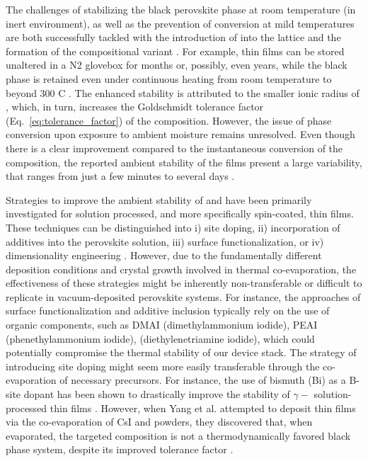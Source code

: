 The challenges of stabilizing the black perovskite phase at room temperature (in inert environment), as well as the prevention of conversion at mild temperatures are both successfully tackled with the introduction of  into the lattice and the formation of the  compositional variant \cite{Sutton2016Bandgap-TunableCells}. For example,  thin films can be stored unaltered in a N2 glovebox for months or, possibly, even years, while the black phase is retained even under continuous heating from room temperature to beyond 300\degree 
C \cite{Papadopoulou2024InEllipsometry}. The enhanced stability is attributed to the smaller ionic radius of , which, in turn, increases the Goldschmidt tolerance factor (Eq.~\ref{eq:tolerance_factor}) of the composition. However, the issue of phase conversion upon exposure to ambient moisture remains unresolved. Even though there is a clear improvement compared to the instantaneous conversion of the  composition, the reported ambient stability of the  films present a large variability, that ranges from just a few minutes to several days \cite{Zhu2022UnderstandingPerovskites, Zheng2021ImprovedCells, Mariotti2018StabilityDevices}. 

Strategies to improve the ambient stability of  and  have been primarily investigated for solution processed, and more specifically spin-coated, thin films. These techniques can be distinguished into i)  site doping, ii) incorporation of additives into the perovskite solution, iii) surface functionalization, or iv) dimensionality engineering \cite{Jin2024PhaseDevices}. However, due to the fundamentally different deposition conditions and crystal growth involved in thermal co-evaporation, the effectiveness of these strategies might be inherently non-transferable or difficult to replicate in vacuum-deposited perovskite systems. For instance, the approaches of surface functionalization and additive inclusion typically rely on the use of organic components, such as DMAI (dimethylammonium iodide), PEAI (phenethylammonium iodide),  (diethylenetriamine iodide), which could potentially compromise the thermal stability of our device stack. The strategy of introducing  site doping might seem more easily transferable through the co-evaporation of necessary precursors. For instance, the use of bismuth (Bi) as a B-site dopant has been shown to drastically improve the stability of $\gamma-$ solution-processed thin films \cite{Hu2017BismuthCells}. However, when Yang et al. attempted to deposit  thin films via the co-evaporation of CsI and  powders, they discovered that, when evaporated, the targeted composition is not a thermodynamically favored black phase system, despite its improved tolerance factor \cite{Yang2021CanPhase}.


